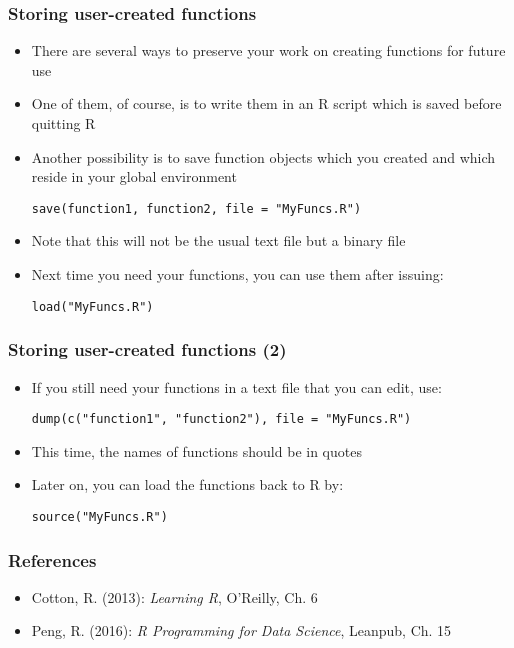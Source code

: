 \documentclass[10pt]{beamer}
\theoremstyle{definition}
\begin{document}
\begin{frame}[fragile]
\frametitle{Storing user-created functions}
\begin{itemize}
	\item There are several ways to preserve your work on creating functions for future use
	\item One of them, of course, is to write them in an R script which is saved before quitting R
	\item Another possibility is to save function objects which you created and which reside in your global environment
	\begin{lstlisting}[style = rstyle, breaklines]
	save(function1, function2, file = "MyFuncs.R")	
	\end{lstlisting}
	\item Note that this will not be the usual text file but a binary file
	\item Next time you need your functions, you can use them after issuing:
	\begin{lstlisting}[style = rstyle, breaklines]
	load("MyFuncs.R")
	\end{lstlisting}
\end{itemize}
\end{frame}

\begin{frame}[fragile]
\frametitle{Storing user-created functions (2)}
\begin{itemize}
	\item If you still need your functions in a text file that you can edit, use:
	\begin{lstlisting}[style = rstyle, breaklines]
	dump(c("function1", "function2"), file = "MyFuncs.R")
	\end{lstlisting}
	\item This time, the names of functions should be in quotes
	\item Later on, you can load the functions back to R by:
	\begin{lstlisting}[style = rstyle, breaklines]
	source("MyFuncs.R")
	\end{lstlisting}
\end{itemize}
\end{frame}

\begin{frame}[fragile]
\frametitle{References}
\begin{itemize}
	\item Cotton, R. (2013): \emph{Learning R}, O'Reilly, Ch. 6
	\item Peng, R. (2016): \emph{R Programming for Data Science}, Leanpub, Ch. 15
\end{itemize}
\end{frame}
\end{document}
